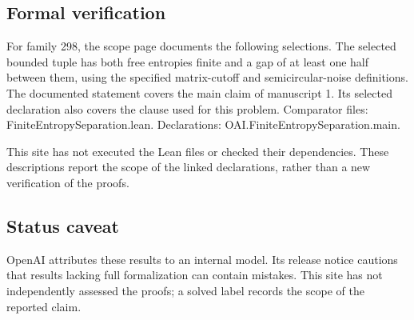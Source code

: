 \documentclass[11pt]{article}
\begin{document}
\subsection{Formal verification}
For family 298, the scope page documents the following selections. The selected bounded tuple has both free entropies finite and a gap of at least one half between them, using the specified matrix-cutoff and semicircular-noise definitions. The documented statement covers the main claim of manuscript 1. Its selected declaration also covers the clause used for this problem. Comparator files: FiniteEntropySeparation.lean. Declarations: OAI.FiniteEntropySeparation.main.

This site has not executed the Lean files or checked their dependencies. These descriptions report the scope of the linked declarations, rather than a new verification of the proofs.

\subsection{Status caveat}
OpenAI attributes these results to an internal model. Its release notice cautions that results lacking full formalization can contain mistakes. This site has not independently assessed the proofs; a solved label records the scope of the reported claim.
\end{document}
